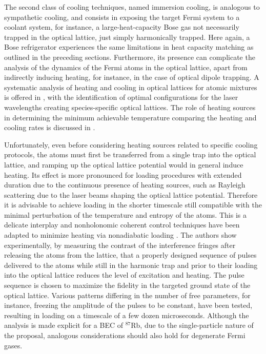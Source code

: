 \documentclass[pra,letterpaper,twocolumn,showpacs,superscriptaddress]{revtex4}
\begin{document}
The second class of cooling techniques, named immersion cooling, is analogous to sympathetic cooling, and consists in exposing the target Fermi system 
to a coolant system, for instance, a large-heat-capacity Bose gas not necessarily trapped in the optical lattice, just simply harmonically trapped. 
Here again, a Bose refrigerator experiences the same limitations in heat capacity matching as outlined in the preceding sections. 
Furthermore, its presence can complicate the analysis of the dynamics of the Fermi atoms in the optical lattice, apart from indirectly inducing heating, for instance, 
in the case of optical dipole trapping. A systematic analysis of heating and cooling in optical lattices for atomic mixtures is offered in \cite{LeBlanc2007}, with the 
identification of optimal configurations for the laser wavelengths creating species-specific optical lattices. The role of heating sources in determining the minimum 
achievable temperature comparing the heating and cooling rates is discussed in \cite{McKayRev2011}.  

Unfortunately, even before considering heating sources related to specific cooling protocols, the atoms must first be transferred from a single trap into the optical 
lattice, and ramping up the optical lattice potential would in general induce heating. Its effect is more pronounced for loading procedures with 
extended duration due to the continuous presence of heating sources, such as Rayleigh scattering due to the laser beams shaping the optical lattice potential. 
Therefore it is advisable to achieve loading in the shorter timescale still compatible with the minimal perturbation of the temperature and entropy of the atoms. 
This is a delicate interplay and nonholonomic coherent control techniques \cite{Lloyd1995,Harel1999,Brion2006} have been adapted to minimize heating 
via nonadiabatic loading \cite{Liu2011}.  The authors show experimentally, by measuring the contrast of the interference fringes after releasing the atoms 
from the lattice, that a properly designed sequence of pulses delivered to the atoms while still in the harmonic trap and prior to their loading into the optical 
lattice reduces the level of excitation and heating. The pulse sequence is chosen to maximize the fidelity in the targeted ground state of the optical lattice. 
Various patterns differing in the number of free parameters, for instance, freezing the amplitude of the pulses to be constant, have been tested, resulting 
in loading on a timescale of a few dozen microseconds. Although the analysis is made explicit for a BEC of ${}^{87}$Rb, due to the 
single-particle nature of the proposal, analogous considerations should also hold for degenerate Fermi gases. 
\end{document}
